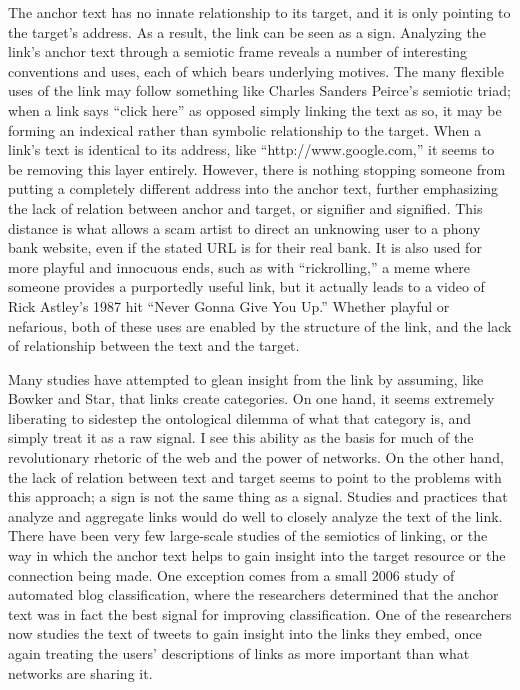 The anchor text has no innate relationship to its target, and it is only pointing to the target's address. As a result, the link can be seen as a sign. Analyzing the link's anchor text through a semiotic frame reveals a number of interesting conventions and uses, each of which bears underlying motives. The many flexible uses of the link may follow something like Charles Sanders Peirce's semiotic triad; when a link says ``click here'' as opposed simply linking the text as so, it may be forming an indexical rather than symbolic relationship to the target. When a link's text is identical to its address, like ``http://www.google.com,'' it seems to be removing this layer entirely. However, there is nothing stopping someone from putting a completely different address into the anchor text, further emphasizing the lack of relation between anchor and target, or signifier and signified. This distance is what allows a scam artist to direct an unknowing user to a phony bank website, even if the stated URL is for their real bank. It is also used for more playful and innocuous ends, such as with ``rickrolling,'' a meme where someone provides a purportedly useful link, but it actually leads to a video of Rick Astley's 1987 hit ``Never Gonna Give You Up.'' Whether playful or nefarious, both of these uses are enabled by the structure of the link, and the lack of relationship between the text and the target.

Many studies have attempted to glean insight from the link by assuming, like Bowker and Star, that links create categories. On one hand, it seems extremely liberating to sidestep the ontological dilemma of what that category is, and simply treat it as a raw signal. I see this ability as the basis for much of the revolutionary rhetoric of the web and the power of networks. On the other hand, the lack of relation between text and target seems to point to the problems with this approach; a sign is not the same thing as a signal. Studies and practices that analyze and aggregate links would do well to closely analyze the text of the link. There have been very few large-scale studies of the semiotics of linking, or the way in which the anchor text helps to gain insight into the target resource or the connection being made. One exception comes from a small 2006 study of automated blog classification, where the researchers determined that the anchor text was in fact the best signal for improving classification.  One of the researchers now studies the text of tweets to gain insight into the links they embed, once again treating the users' descriptions of links as more important than what networks are sharing it.

